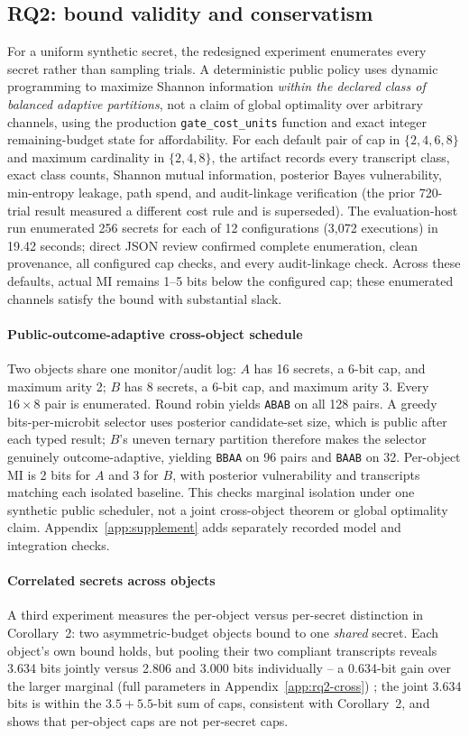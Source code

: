 \documentclass[conference,compsoc]{IEEEtran}
\newcommand{\rev}[1]{#1} %
\begin{document}
\subsection{RQ2: bound validity and conservatism}
For a uniform synthetic secret, the redesigned experiment enumerates every
secret rather than sampling trials. A deterministic public policy uses
dynamic programming to maximize Shannon information \emph{within the
declared class of balanced adaptive partitions}, not a claim of global
optimality over arbitrary channels, using the production
\texttt{gate\_cost\_units} function and exact integer remaining-budget
state for affordability. For each default pair of cap in $\{2,4,6,8\}$ and
maximum cardinality in $\{2,4,8\}$, the artifact records every transcript
class, exact class counts, Shannon mutual information, posterior Bayes
vulnerability, min-entropy leakage, path spend, and audit-linkage
verification (the prior 720-trial result measured a different cost rule
and is superseded). The evaluation-host run enumerated 256 secrets for
each of 12 configurations (3{,}072 executions) in 19.42 seconds; direct
JSON review confirmed complete enumeration, clean provenance, all
configured cap checks, and every audit-linkage check.
Across these defaults, actual MI remains 1--5 bits below the configured cap;
these enumerated channels satisfy the bound with substantial slack.

\paragraph{Public-outcome-adaptive cross-object schedule} Two objects share
one monitor/audit log: $A$ has 16 secrets, a 6-bit cap, and maximum arity 2;
$B$ has 8 secrets, a 6-bit cap, and maximum arity 3. Every $16\times8$ pair
is enumerated. Round robin yields \texttt{ABAB} on all 128 pairs. A greedy
bits-per-microbit selector uses posterior candidate-set size, which is public
after each typed result; $B$'s uneven ternary partition therefore makes the
selector genuinely outcome-adaptive, yielding \texttt{BBAA} on 96 pairs and
\texttt{BAAB} on 32. Per-object MI is 2 bits for $A$ and 3 for $B$, with
posterior vulnerability and transcripts matching each isolated baseline.
This checks marginal isolation under one synthetic public scheduler, not a
joint cross-object theorem or global optimality claim. Appendix~\ref{app:supplement} adds separately recorded model and integration checks.

\paragraph{Correlated secrets across objects} A third experiment
\rev{measures the per-object versus per-secret distinction in Corollary~2:} two asymmetric-budget objects bound to one \emph{shared}
secret. Each object's own bound holds, but pooling their two compliant
transcripts reveals 3.634 bits jointly versus 2.806 and 3.000 bits
individually -- a 0.634-bit gain over the larger marginal (full parameters in
Appendix~\ref{app:rq2-cross}) \rev{; the joint 3.634 bits is within the $3.5+5.5$-bit sum of caps, consistent with Corollary~2, and shows that per-object caps are not per-secret caps.}
\end{document}
